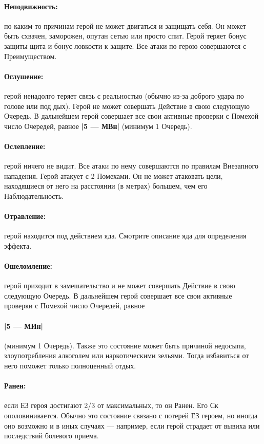 \paragraph{Неподвижность:} по каким-то причинам герой не может двигаться и защищать себя. Он может быть схвачен, заморожен, опутан сетью или просто спит. Герой теряет бонус защиты щита и бонус ловкости к защите. Все атаки по герою совершаются с Преимуществом.
\paragraph{Оглушение:} герой ненадолго теряет связь с реальностью (обычно из-за доброго удара по голове или под дых). Герой не может совершать Действие в свою следующую Очередь. В дальнейшем герой совершает все свои активные проверки с Помехой число Очередей, равное \textbf{|5 — МВн|} (минимум 1 Очередь).
\paragraph{Ослепление:} герой ничего не видит. Все атаки по нему совершаются по правилам Внезапного нападения. Герой атакует с 2 Помехами. Он не может атаковать цели, находящиеся от него на расстоянии (в метрах) большем, чем его Наблюдательность.
\paragraph{Отравление:} герой находится под действием яда. Смотрите описание яда для определения эффекта.
\paragraph{Ошеломление:} герой приходит в замешательство и не может совершать Действие в свою следующую Очередь. В дальнейшем герой совершает все свои активные проверки с Помехой число Очередей, равное \paragraph{|5 — МИн|} (минимум 1 Очередь). Также это состояние может быть причиной недосыпа, злоупотребления алкоголем или наркотическими зельями. Тогда избавиться от него поможет только полноценный отдых.
\paragraph{Ранен:} если ЕЗ героя достигают 2/3 от максимальных, то он Ранен. Его Ск ополовинивается. Обычно это состояние связано с потерей ЕЗ героем, но иногда оно возможно и в иных случаях — например, если герой страдает от вывиха или последствий болевого приема.
